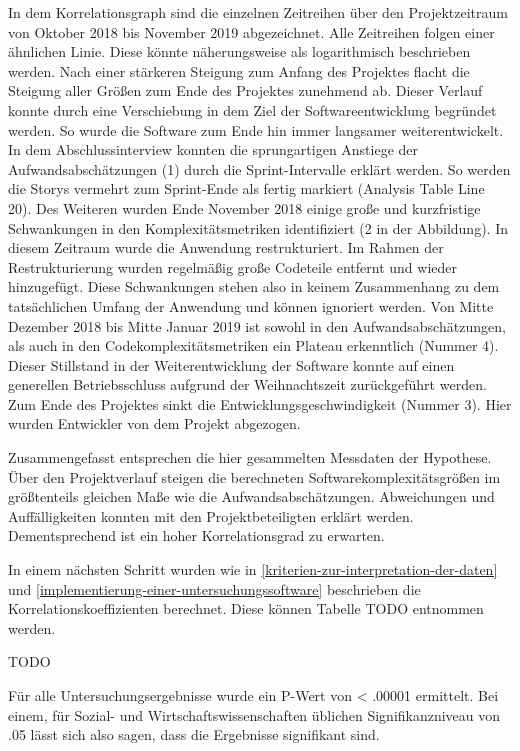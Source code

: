 In dem Korrelationsgraph sind die einzelnen Zeitreihen über den
Projektzeitraum von Oktober 2018 bis November 2019 abgezeichnet. Alle
Zeitreihen folgen einer ähnlichen Linie. Diese könnte näherungsweise als
logarithmisch beschrieben werden. Nach einer stärkeren Steigung zum
Anfang des Projektes flacht die Steigung aller Grö\ss en zum Ende des
Projektes zunehmend ab. Dieser Verlauf konnte durch eine Verschiebung in
dem Ziel der Softwareentwicklung begründet werden. So wurde die Software
zum Ende hin immer langsamer weiterentwickelt. In dem Abschlussinterview
konnten die sprungartigen Anstiege der Aufwandsabschätzungen (1) durch
die Sprint-Intervalle erklärt werden. So werden die Storys vermehrt zum
Sprint-Ende als fertig markiert (Analysis Table Line 20). Des Weiteren
wurden Ende November 2018 einige gro\ss e und kurzfristige Schwankungen in
den Komplexitätsmetriken identifiziert (2 in der Abbildung). In diesem
Zeitraum wurde die Anwendung restrukturiert. Im Rahmen der
Restrukturierung wurden regelmä\ss ig gro\ss e Codeteile entfernt und wieder
hinzugefügt. Diese Schwankungen stehen also in keinem Zusammenhang zu
dem tatsächlichen Umfang der Anwendung und können ignoriert werden. Von
Mitte Dezember 2018 bis Mitte Januar 2019 ist sowohl in den
Aufwandsabschätzungen, als auch in den Codekomplexitätsmetriken ein
Plateau erkenntlich (Nummer 4). Dieser Stillstand in der
Weiterentwicklung der Software konnte auf einen generellen
Betriebsschluss aufgrund der Weihnachtszeit zurückgeführt werden. Zum
Ende des Projektes sinkt die Entwicklungsgeschwindigkeit (Nummer 3).
Hier wurden Entwickler von dem Projekt abgezogen.

Zusammengefasst entsprechen die hier gesammelten Messdaten der
Hypothese. Über den Projektverlauf steigen die berechneten
Softwarekomplexitätsgrö\ss en im grö\ss tenteils gleichen Ma\ss e wie die
Aufwandsabschätzungen. Abweichungen und Auffälligkeiten konnten mit den
Projektbeteiligten erklärt werden. Dementsprechend ist ein hoher
Korrelationsgrad zu erwarten.

In einem nächsten Schritt wurden wie in \ref{kriterien-zur-interpretation-der-daten} und \ref{implementierung-einer-untersuchungssoftware} beschrieben die
Korrelationskoeffizienten berechnet. Diese können Tabelle TODO entnommen
werden.

TODO

Für alle Untersuchungsergebnisse wurde ein P-Wert von \textless{} .00001
ermittelt.
Bei einem, für Sozial- und Wirtschaftswissenschaften üblichen
Signifikanzniveau von .05 lässt sich also sagen, dass die Ergebnisse
signifikant sind.

